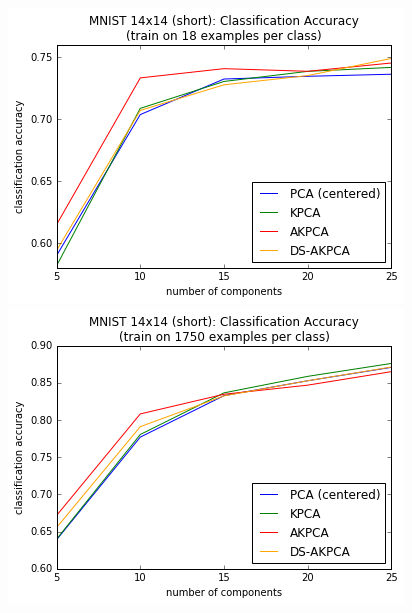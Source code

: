 \documentclass[]{article}
\begin{document}
\begin{figure}[h]
\begin{center}
\includegraphics[scale=0.5]{figures/mnist_14_short_classify_18}
\includegraphics[scale=0.5]{figures/mnist_14_short_classify_1750}


\end{center}
\end{figure}
\end{document}

